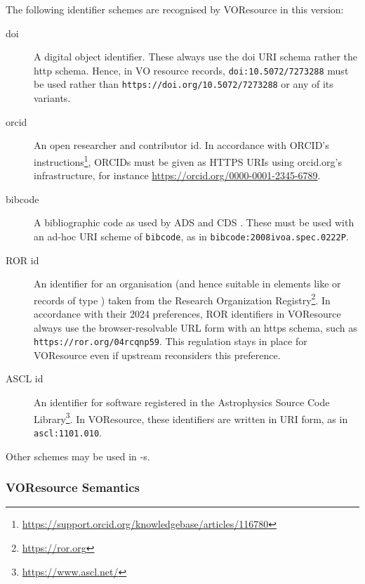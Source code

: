 \documentclass[11pt,a4paper]{ivoa}
\begin{document}
The following identifier schemes are recognised by VOResource in this
version:

\begin{description}
\item[doi] A digital object identifier.  These always use the doi URI
schema rather the http schema.  Hence, in VO resource records,
\verb|doi:10.5072/7273288| must be used rather than
\nolinkurl{https://doi.org/10.5072/7273288} or any of its variants.

\item[orcid] An open researcher and contributor id. In
accordance with ORCID's
instructions\footnote{\url{https://support.orcid.org/knowledgebase/articles/116780}}, ORCIDs must be given
as HTTPS URIs using orcid.org's infrastructure, for instance
\url{https://orcid.org/0000-0001-2345-6789}.

\item[bibcode] A bibliographic code as used by
ADS and CDS \citep{1995ASSL..203..259S}.  These
must be used with an ad-hoc URI scheme of \verb|bibcode|, as in
\verb|bibcode:2008ivoa.spec.0222P|.

\item[ROR id] An identifier for an organisation (and hence suitable in
elements like  or records of type
) taken from the Research Organization
Registry\footnote{\url{https://ror.org}}.  In accordance with their 2024
preferences, ROR identifiers in VOResource always use the
browser-resolvable URL form with an https schema, such as
\nolinkurl{https://ror.org/04rcqnp59}.  This regulation stays in place
for VOResource even if upstream reconsiders this preference.

\item[ASCL id] An identifier for software registered in the Astrophysics
Source Code Library\footnote{\url{https://www.ascl.net/}}.  In
VOResource, these identifiers are written in URI form, as in
\verb|ascl:1101.010|.

\end{description}

Other schemes may be used in -s.

\subsubsection{VOResource Semantics}
\end{document}
